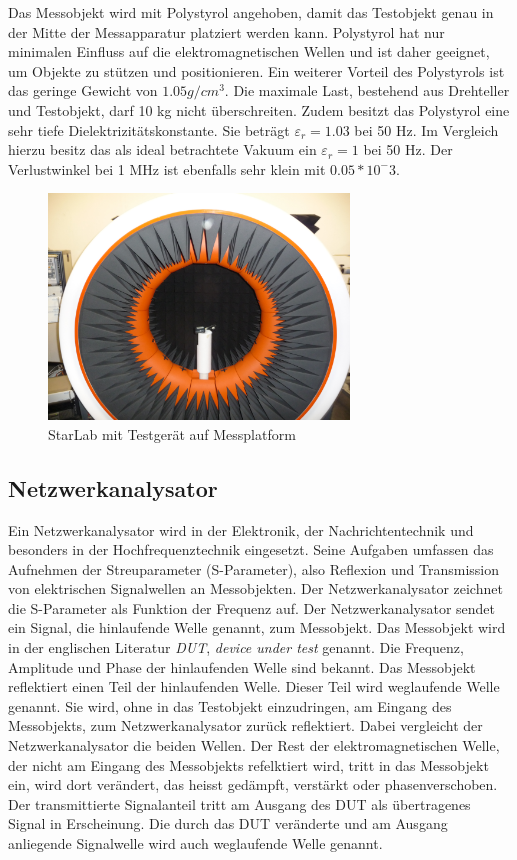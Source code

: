 Das Messobjekt wird mit Polystyrol angehoben, damit das Testobjekt genau in der Mitte der Messapparatur platziert werden kann. Polystyrol hat nur minimalen Einfluss auf die elektromagnetischen Wellen und ist daher geeignet, um Objekte zu stützen und positionieren. Ein weiterer Vorteil des Polystyrols ist das geringe Gewicht von $1.05 g/cm^3$. Die maximale Last, bestehend aus Drehteller und Testobjekt, darf  10 kg  nicht überschreiten. Zudem besitzt das Polystyrol eine sehr tiefe Dielektrizitätskonstante. Sie beträgt $\varepsilon_r=1.03$ bei 50 Hz. Im Vergleich hierzu besitz das als ideal betrachtete Vakuum   ein $\varepsilon_r=1$ bei 50 Hz. Der Verlustwinkel bei 1 MHz ist ebenfalls sehr klein mit $0.05*10^-3$.
\cite{StarLab,Polystyrol_Datenblatt,WikiPermitt} 

\begin{figure}[!h]
	\centering
	\includegraphics[width=8cm]{content/bilder/Implementierung/StarLab.JPG}%
	\caption{StarLab mit Testgerät auf Messplatform}
	\label{fig:StarLab}
\end{figure}

\subsection{Netzwerkanalysator}
Ein Netzwerkanalysator wird in der Elektronik, der Nachrichtentechnik und besonders in der Hochfrequenztechnik eingesetzt. Seine Aufgaben umfassen das Aufnehmen der Streuparameter (S-Parameter), also Reflexion und Transmission von elektrischen Signalwellen an Messobjekten. Der Netzwerkanalysator zeichnet die S-Parameter als Funktion der Frequenz auf. Der Netzwerkanalysator sendet ein Signal, die  hinlaufende Welle genannt, zum  Messobjekt. Das Messobjekt wird in der englischen Literatur  \textit{DUT}, \textit{device under test} genannt. Die  Frequenz, Amplitude und Phase der hinlaufenden Welle sind bekannt. Das Messobjekt reflektiert einen Teil der hinlaufenden Welle. Dieser Teil wird weglaufende Welle genannt. Sie wird, ohne in das Testobjekt einzudringen, am Eingang des Messobjekts, zum Netzwerkanalysator zurück reflektiert. Dabei vergleicht der Netzwerkanalysator die beiden Wellen. Der Rest der elektromagnetischen Welle, der nicht am Eingang des Messobjekts refelktiert wird, tritt in das Messobjekt ein, wird dort verändert, das heisst gedämpft, verstärkt oder phasenverschoben. Der transmittierte Signalanteil tritt am Ausgang des DUT als übertragenes Signal in Erscheinung. Die durch das DUT veränderte und am Ausgang anliegende Signalwelle wird auch  weglaufende Welle genannt.

